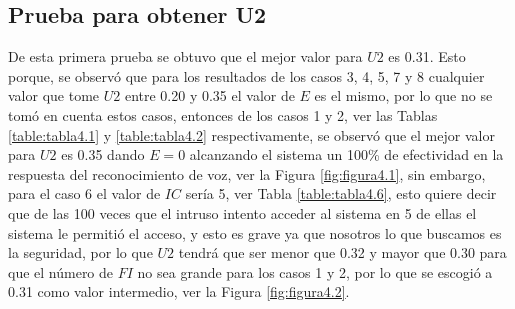\subsection{Prueba para obtener U2}
\par
De esta primera prueba se obtuvo que el mejor valor para $U2$ es 0.31. Esto porque, se observó que para los resultados de los casos 3, 4, 5, 7 y 8 cualquier valor que tome $U2$ entre 0.20 y 0.35 el valor de $E$ es el mismo, por lo que no se tomó en cuenta estos casos, entonces de los casos 1 y 2, ver las Tablas \ref{table:tabla4.1} y \ref{table:tabla4.2} respectivamente, se observó que el mejor valor para $U2$ es 0.35 dando $E = 0$ alcanzando el sistema un 100\% de efectividad en la respuesta del reconocimiento de voz, ver la Figura \ref{fig:figura4.1}, sin embargo, para el caso 6 el valor de $IC$ sería 5, ver Tabla \ref{table:tabla4.6}, esto quiere decir que de las 100 veces que el intruso intento acceder al sistema en 5 de ellas el sistema le permitió el acceso, y esto es grave ya que nosotros lo que buscamos es la seguridad, por lo que $U2$ tendrá que ser menor que 0.32 y mayor que 0.30 para que el número de $FI$ no sea grande para los casos 1 y 2, por lo que se escogió a 0.31 como valor intermedio, ver la Figura \ref{fig:figura4.2}.

